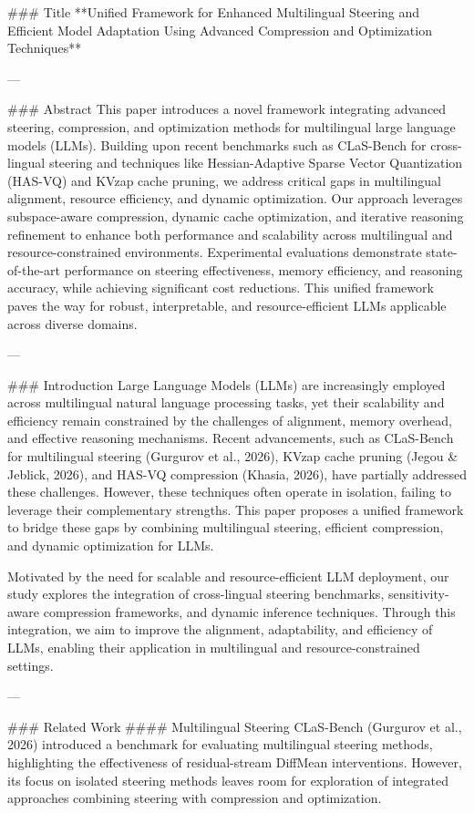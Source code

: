 ### Title  
**Unified Framework for Enhanced Multilingual Steering and Efficient Model Adaptation Using Advanced Compression and Optimization Techniques**

---

### Abstract  
This paper introduces a novel framework integrating advanced steering, compression, and optimization methods for multilingual large language models (LLMs). Building upon recent benchmarks such as CLaS-Bench for cross-lingual steering and techniques like Hessian-Adaptive Sparse Vector Quantization (HAS-VQ) and KVzap cache pruning, we address critical gaps in multilingual alignment, resource efficiency, and dynamic optimization. Our approach leverages subspace-aware compression, dynamic cache optimization, and iterative reasoning refinement to enhance both performance and scalability across multilingual and resource-constrained environments. Experimental evaluations demonstrate state-of-the-art performance on steering effectiveness, memory efficiency, and reasoning accuracy, while achieving significant cost reductions. This unified framework paves the way for robust, interpretable, and resource-efficient LLMs applicable across diverse domains.

---

### Introduction  
Large Language Models (LLMs) are increasingly employed across multilingual natural language processing tasks, yet their scalability and efficiency remain constrained by the challenges of alignment, memory overhead, and effective reasoning mechanisms. Recent advancements, such as CLaS-Bench for multilingual steering (Gurgurov et al., 2026), KVzap cache pruning (Jegou & Jeblick, 2026), and HAS-VQ compression (Khasia, 2026), have partially addressed these challenges. However, these techniques often operate in isolation, failing to leverage their complementary strengths. This paper proposes a unified framework to bridge these gaps by combining multilingual steering, efficient compression, and dynamic optimization for LLMs.

Motivated by the need for scalable and resource-efficient LLM deployment, our study explores the integration of cross-lingual steering benchmarks, sensitivity-aware compression frameworks, and dynamic inference techniques. Through this integration, we aim to improve the alignment, adaptability, and efficiency of LLMs, enabling their application in multilingual and resource-constrained settings.

---

### Related Work  
#### Multilingual Steering  
CLaS-Bench (Gurgurov et al., 2026) introduced a benchmark for evaluating multilingual steering methods, highlighting the effectiveness of residual-stream DiffMean interventions. However, its focus on isolated steering methods leaves room for exploration of integrated approaches combining steering with compression and optimization.

